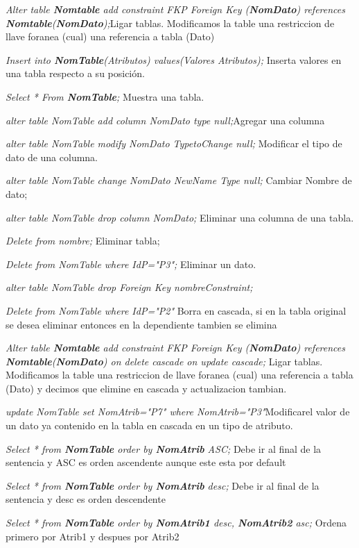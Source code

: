 \documentclass[12pt, fleqn]{report}                             %
\theoremstyle{break}                                            %
\begin{document}
	\emph{Alter table \textbf{Nomtable} add constraint FKP Foreign Key (\textbf{NomDato}) references \textbf{Nomtable}(\textbf{NomDato});}Ligar tablas. Modificamos la table una restriccion de llave foranea (cual) una referencia a tabla (Dato)


	\emph{Insert into \textbf{NomTable}(Atributos) values(Valores Atributos);} Inserta valores en una tabla respecto a su posición.

	\emph{Select * From \textbf{NomTable};} Muestra una tabla.

	\emph{alter table NomTable add column NomDato type null;}Agregar una columna

	\emph{alter table NomTable modify NomDato TypetoChange null;} Modificar el tipo de dato de una columna.

	\emph{alter table NomTable change NomDato NewName Type null;} Cambiar Nombre de dato;

	\emph{alter table NomTable drop column NomDato;} Eliminar una columna de una tabla.

	\emph{Delete from nombre;} Eliminar tabla;


	\emph{Delete from NomTable where IdP="P3";} Eliminar un dato.


	\emph{alter table NomTable drop Foreign Key nombreConstraint;}

	\emph{Delete from NomTable where IdP="P2"} Borra en cascada, si en la tabla original se desea eliminar entonces en la dependiente tambien se elimina


	\emph{Alter table \textbf{Nomtable} add constraint FKP Foreign Key (\textbf{NomDato}) references \textbf{Nomtable}(\textbf{NomDato}) on delete cascade on update cascade;} Ligar tablas. Modificamos la table una restriccion de llave foranea (cual) una referencia a tabla (Dato) y decimos que elimine en cascada y actualizacion tambian.

	\emph{update NomTable set NomAtrib="P7" where NomAtrib="P3"}Modificarel valor de un dato ya contenido en la tabla en cascada en un tipo de atributo.


	   \emph{Select * from \textbf{NomTable} order by \textbf{NomAtrib} ASC;} Debe ir al final de la sentencia y ASC es orden ascendente aunque este esta por default

    \emph{Select * from \textbf{NomTable} order by \textbf{NomAtrib} desc;} Debe ir al final de la sentencia y desc es orden descendente

        \emph{Select * from \textbf{NomTable} order by \textbf{NomAtrib1} desc, \textbf{NomAtrib2} asc;} Ordena primero por Atrib1 y despues por Atrib2
\end{document}
